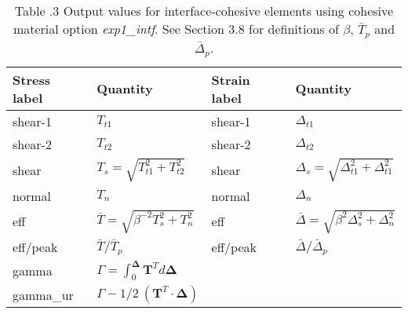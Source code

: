 \documentclass[11pt]{report}
\numberwithin{equation}{section}
\newcommand{\bmf } {\boldsymbol }  %
\newcommand{\ti}{\emph}
\begin{document}
\begin{table}[htb]	
\centering
\small
{
\setlength{\extrarowheight}{4 pt}
\begin{tabular}{ | p{1.0in} | >{\centering\arraybackslash}m{1.5in} | | p{1.0in} | >{\centering\arraybackslash}m{1.5in} |  }
 \hline
  Stress label & Quantity& Strain label& Quantity \\
\hline \hline
\hspace{0.25in}shear-1 & $T_{t1}$& \hspace{0.25in}shear-1 & $\Delta_{t1}$ \\
\hspace{0.25in}shear-2 & $T_{t2}$ & \hspace{0.25in}shear-2 & $\Delta_{t2}$ \\ 
\hspace{0.25in}shear & $T_s = \sqrt{T_{t1}^2 + T_{t2}^2}$ & \hspace{0.25in}shear & $ \Delta_s = \sqrt{\Delta_{t1}^2 + \Delta_{t1}^2}$ \\ 
\hspace{0.25in}normal & $T_n$ & \hspace{0.25in}normal & $\Delta_n$ \\

\hspace{0.25in}eff & $\bar T = \sqrt{\beta^{-2} T_s^2 + T_n^2}$  &\hspace{0.25in}eff & $\bar \Delta = \sqrt{\beta^2 \Delta_s^2 + \Delta_n^2} $ \\
\hspace{0.25in}eff/peak & $\bar T / \bar T_p$ &\hspace{0.25in}eff/peak & $\bar \Delta / \bar \Delta_p$  \\ \hline

\hspace{0.25in}gamma &$  \Gamma = \int_0^{\bmf{\Delta}} \bmf{T}^T d\bmf{\Delta}$ & & \\ 
\hspace{0.25in}gamma\_ur & $\Gamma - 1/2\ ( \bmf{T}^T \cdot \bmf{\Delta})$& &  \\ \hline 
\end{tabular}}
%
\begin{minipage}[c]{6in}
\caption{\\ \small Table \thesection.3
Output values for interface-cohesive elements using 
cohesive material option \ti{exp1\_intf}.  See Section 3.8 for definitions
of $\beta$, $\bar T_p$ and $\bar \Delta_p$.}
\end{minipage}
\label{table:linear_model_output}
\end{table}
\normalsize
\end{document}
